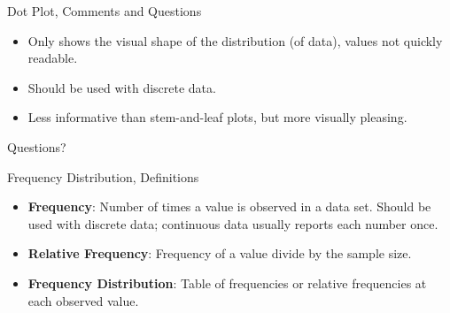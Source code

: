 \documentclass{beamer}
\newcommand{\blue}[1]{{\color{blue} #1}}
\newcommand{\red}[1]{{\color{red} #1}}
\newcommand{\qtns}[0]{\begin{center} Questions? \end{center}}
\begin{document}
\begin{frame}{Dot Plot, Comments and Questions}
    \begin{itemize}
        \item Only shows the visual shape of the distribution (of data), values not quickly readable.
        \item Should be used with discrete data.
        \item Less informative than stem-and-leaf plots, but more visually pleasing.
    \end{itemize}
    \qtns
\end{frame}

\begin{frame}{Frequency Distribution, Definitions}
    \begin{itemize}
        \item {\bf Frequency}: Number of times a value is observed in a data set. Should be used with discrete data; continuous data usually reports each number once.
        \item {\bf Relative Frequency}: Frequency of a value divide by the sample size.
        \item {\bf Frequency Distribution}: Table of frequencies or relative frequencies at each observed value.
    \end{itemize}
\end{frame}

\begin{center}
\end{center}
\end{document}
